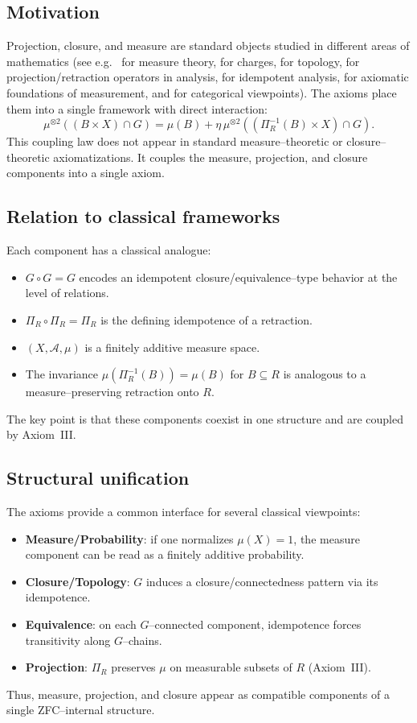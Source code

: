 \documentclass[11pt]{article}
\numberwithin{equation}{section}
\theoremstyle{definition}
\begin{document}
\subsection{Motivation}

Projection, closure, and measure are standard objects studied in different areas of mathematics (see e.g.\ \cite{Halmos,Bogachev,AliprantisBorder} for measure theory, \cite{Rao,Fremlin} for charges, \cite{Kuratowski} for topology, \cite{BauschkeCombettes} for projection/retraction operators in analysis, \cite{KolokoltsovMaslov} for idempotent analysis, \cite{KrantzEtAl} for axiomatic foundations of measurement, and \cite{MacLane,Awodey,Riehl} for categorical viewpoints).
The axioms place them into a single framework with direct interaction:
\[
\mu^{\otimes2}((B\times X)\cap G)
= \mu(B) + \eta\,\mu^{\otimes2}((\Pi_R^{-1}(B)\times X)\cap G).
\]
This coupling law does not appear in standard measure--theoretic or closure--theoretic axiomatizations.
It couples the measure, projection, and closure components into a single axiom.

\subsection{Relation to classical frameworks}

Each component has a classical analogue:
\begin{itemize}[nosep]
  \item $G\circ G = G$ encodes an idempotent closure/equivalence--type behavior at the level of relations.
  \item $\Pi_R\circ\Pi_R = \Pi_R$ is the defining idempotence of a retraction.
  \item $(X,\mathcal A,\mu)$ is a finitely additive measure space.
  \item The invariance $\mu(\Pi_R^{-1}(B))=\mu(B)$ for $B\subseteq R$ is analogous to a measure--preserving retraction onto $R$.
\end{itemize}
The key point is that these components coexist in one structure and are coupled by Axiom~III.

\subsection{Structural unification}

The axioms provide a common interface for several classical viewpoints:
\begin{itemize}[nosep]
  \item \textbf{Measure/Probability}: if one normalizes $\mu(X)=1$, the measure component can be read as a finitely additive probability.
  \item \textbf{Closure/Topology}: $G$ induces a closure/connectedness pattern via its idempotence.
  \item \textbf{Equivalence}: on each $G$--connected component, idempotence forces transitivity along $G$--chains.
  \item \textbf{Projection}: $\Pi_R$ preserves $\mu$ on measurable subsets of $R$ (Axiom~III).
\end{itemize}
Thus, measure, projection, and closure appear as compatible components of a single ZFC--internal structure.
\end{document}
